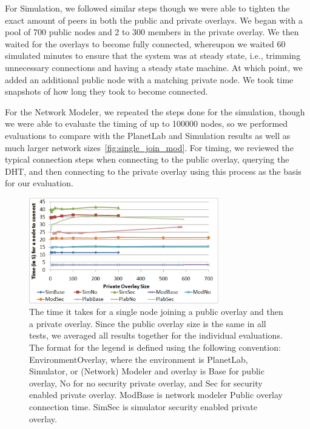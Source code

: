 \documentclass[conference]{IEEEtran}
\begin{document}
For Simulation, we followed similar steps though we were able to tighten the
exact amount of peers in both the public and private overlays.  We began with
a pool of 700 public nodes and 2 to 300 members in the private overlay.  We
then waited for the overlays to become fully connected, whereupon we waited
60 simulated minutes to ensure that the system was at steady state, i.e.,
trimming unnecessary connections and having a steady state machine.  At which
point, we added an additional public node with a matching private node.  We
took time snapshots of how long they took to become connected.

For the Network Modeler, we repeated the steps done for the simulation, though
we were able to evaluate the timing of up to 100000 nodes, so we performed
evaluations to compare with the PlanetLab and Simulation results as well as
much larger network sizes~\ref{fig:single_join_mod}.  For timing, we reviewed
the typical connection steps when connecting to the public overlay, querying
the DHT, and then connecting to the private overlay using this process as the
basis for our evaluation.

\begin{figure}[h]
\centering
\includegraphics[width=3.25in]{single_join.eps}
\caption{The time it takes for a single node joining a public overlay and then
a private overlay. Since the public overlay size is the same in all tests, we
averaged all results together for the individual evaluations.  The format for
the legend is defined using the following convention: EnvironmentOverlay,
where the environment is PlanetLab, Simulator, or (Network) Modeler and
overlay is Base for public overlay, No for no security private overlay, and
Sec for security enabled private overlay.  ModBase is network modeler
Public overlay connection time.  SimSec is simulator security enabled private
overlay.}
\label{fig:single_join}
\end{figure}
\end{document}
